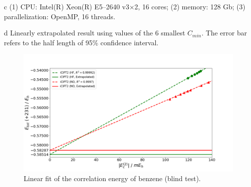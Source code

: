 \documentclass[journal=jcp,manuscript=suppinfo]{achemso}
\begin{document}
\begin{table}[!htp]
\begin{threeparttable}
\begin{tablenotes}
\item[c](1) CPU: Intel(R) Xeon(R) E5--2640 v3$\times$2, 16 cores; (2) memory: 128 Gb;
			(3) parallelization: OpenMP, 16 threads.
\item[d]Linearly extrapolated result using values of the 6 smallest $C_{min}$. The error bar refers to the half length of 95\% confidence interval.
		\end{tablenotes}
	\end{threeparttable}
	\label{OldHF}
\end{table}

\begin{figure}[!htp]
	\centering
	\includegraphics[width=\textwidth]{figures/ici/benzene_ici.png}
	\caption{ Linear fit of the correlation energy of benzene (blind test).}\label{BenzeneEn}
\end{figure}
\end{document}
